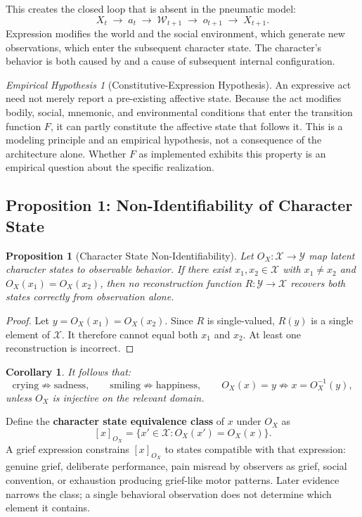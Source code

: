 \documentclass[11pt,a4paper]{article}
\theoremstyle{plain}
\newtheorem{proposition}[theorem]{Proposition}
\newtheorem{corollary}[theorem]{Corollary}
\theoremstyle{definition}
\theoremstyle{remark}
\newtheorem{hypothesis}[theorem]{Empirical Hypothesis}
\begin{document}
This creates the closed loop that is absent in the pneumatic model:
\[
X_t \;\to\; a_t \;\to\; \mathcal{W}_{t+1} \;\to\; o_{t+1} \;\to\; X_{t+1}.
\]
Expression modifies the world and the social environment, which generate new observations, which enter the subsequent character state. The character's behavior is both caused by and a cause of subsequent internal configuration.

\begin{hypothesis}[Constitutive-Expression Hypothesis]
An expressive act need not merely report a pre-existing affective state. Because the act modifies bodily, social, mnemonic, and environmental conditions that enter the transition function $F$, it can partly constitute the affective state that follows it. This is a modeling principle and an empirical hypothesis, not a consequence of the architecture alone. Whether $F$ as implemented exhibits this property is an empirical question about the specific realization.
\end{hypothesis}

\subsection{Proposition 1: Non-Identifiability of Character State}

\begin{proposition}[Character State Non-Identifiability]
\label{prop:nonid}
Let $O_X : \mathcal{X} \to \mathcal{Y}$ map latent character states to observable behavior. If there exist $x_1, x_2 \in \mathcal{X}$ with $x_1 \neq x_2$ and $O_X(x_1) = O_X(x_2)$, then no reconstruction function $R : \mathcal{Y} \to \mathcal{X}$ recovers both states correctly from observation alone.
\end{proposition}

\begin{proof}
Let $y = O_X(x_1) = O_X(x_2)$. Since $R$ is single-valued, $R(y)$ is a single element of $\mathcal{X}$. It therefore cannot equal both $x_1$ and $x_2$. At least one reconstruction is incorrect.
\end{proof}

\begin{corollary}
It follows that:
\[
\text{crying} \not\Rightarrow \text{sadness}, \qquad \text{smiling} \not\Rightarrow \text{happiness}, \qquad O_X(x) = y \not\Rightarrow x = O_X^{-1}(y),
\]
unless $O_X$ is injective on the relevant domain.
\end{corollary}

Define the \textbf{character state equivalence class} of $x$ under $O_X$ as
\[
[x]_{O_X} = \{x' \in \mathcal{X} : O_X(x') = O_X(x)\}.
\]
A grief expression constrains $[x]_{O_X}$ to states compatible with that expression: genuine grief, deliberate performance, pain misread by observers as grief, social convention, or exhaustion producing grief-like motor patterns. Later evidence narrows the class; a single behavioral observation does not determine which element it contains.
\end{document}
